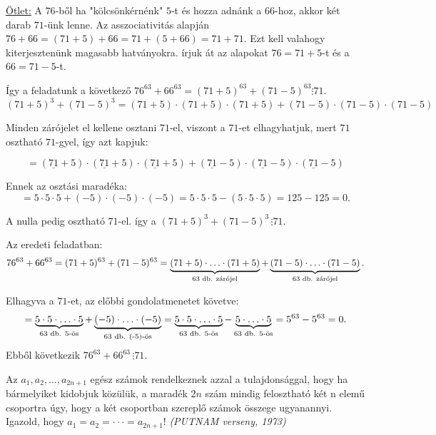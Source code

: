 \begin{solution}
\underline{Ötlet:} A $76$-ből ha "kölcsönkérnénk" $5$-t és hozza
adnánk a $66$-hoz, akkor két darab $71$-ünk lenne. Az asszociativitás
alapján $76+66=(71+5)+66=71+(5+66)=71+71$. Ezt kell valahogy kiterjesztenünk
magasabb hatványokra. írjuk át az alapokat $76=71+5$-t és a $66=71-5$-t.

\noindent Így a feladatunk a következő $76^{63}+66^{63}=(71+5)^{63}+(71-5)^{63}\vdots71$.
\[
(71+5)^{3}+(71-5)^{3}=(71+5)\cdot(71+5)\cdot(71+5)+(71-5)\cdot(71-5)\cdot(71-5)
\]

\noindent Minden zárójelet el kellene osztani $71$-el, viszont a
$71$-et elhagyhatjuk, mert $71$ osztható $71$-gyel, így azt kapjuk:

\[
=(\underline{71}+5)\cdot(\underline{71}+5)\cdot(\underline{71}+5)+(\underline{71}-5)\cdot(\underline{71}-5)\cdot(\underline{71}-5)
\]

\noindent Ennek az osztási maradéka: 
\[
=5\cdot5\cdot5+(-5)\cdot(-5)\cdot(-5)=5\cdot5\cdot5-(5\cdot5\cdot5)=125-125=0.
\]

\noindent A nulla pedig osztható $71$-el. így a $(71+5)^{3}+(71-5)^{3}\,\vdots71$.

\noindent Az eredeti feladatban: 
\[
76^{63}+66^{63}=(71+5)^{63}+(71-5)^{63}=\underbrace{(71+5)\cdot\ldots\cdot(71+5)}_{\textnormal{63 db. zárójel}}+\underbrace{(71-5)\cdot\ldots\cdot(71-5)}_{\textnormal{63 db. zárójel}}.
\]

\noindent Elhagyva a $71$-et, az előbbi gondolatmenetet követve:
\[
=\underbrace{5\cdot5\cdot\ldots\cdot5}_{\textnormal{63 db. 5-ös}}+\underbrace{(-5)\cdot\ldots\cdot(-5)}_{\textnormal{63 db. (-5)-ös}}=\underbrace{5\cdot5\cdot\ldots\cdot5}_{\textnormal{63 db. 5-ös}}-\underbrace{5\cdot\ldots\cdot5}_{\textnormal{63 db. 5-ös}}=5^{63}-5^{63}=0.
\]
Ebből következik $76^{63}+66^{63}\,\vdots71$. 
\end{solution}
\begin{extraproblem}
Az $a_{1},a_{2},...,a_{2n+1}$ egész számok rendelkeznek azzal a
tulajdonsággal, hogy ha bármelyiket kidobjuk közülük, a maradék $2n$
szám mindig felosztható két n elemű csoportra úgy, hogy a két csoportban
szereplő számok összege ugyanannyi. Igazold, hogy $a_{1}=a_{2}=\cdot\cdot\cdot=a_{2n+1}$!
\emph{(PUTNAM verseny, 1973) }
\end{extraproblem}

